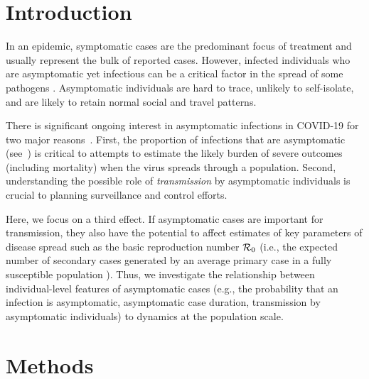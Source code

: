\section{Introduction}

In an epidemic, symptomatic cases are the predominant focus of treatment and usually represent the bulk of reported cases. 
However, infected individuals who are asymptomatic yet infectious can be a critical factor in the spread of some pathogens \citep{fraser2004factors}.
Asymptomatic individuals are hard to trace, unlikely to self-isolate, and are likely to retain normal social and travel patterns.

There is significant ongoing interest in asymptomatic infections in COVID-19 for two major reasons~\citep{fauci_nejm2020}. 
First, the proportion of infections that are asymptomatic (see~\citep{mizumoto_2020}) is critical to attempts to estimate the likely burden of severe outcomes (including mortality) when the virus spreads through a population.
Second, understanding the possible role of \emph{transmission} by asymptomatic individuals is crucial to planning surveillance and control efforts.

Here, we focus on a third effect. 
If asymptomatic cases are important for transmission, they also have the potential to affect estimates of key parameters of disease spread such as the basic reproduction number ${\cal{R}}_0$ (i.e., the expected number of secondary cases generated by an average primary case in a fully susceptible population \citep{anderson1992infectious}). 
Thus, we investigate the relationship between individual-level features of asymptomatic cases (e.g., the probability that an infection is asymptomatic, asymptomatic case duration, transmission by asymptomatic individuals) to dynamics at the population scale.

\section{Methods}

